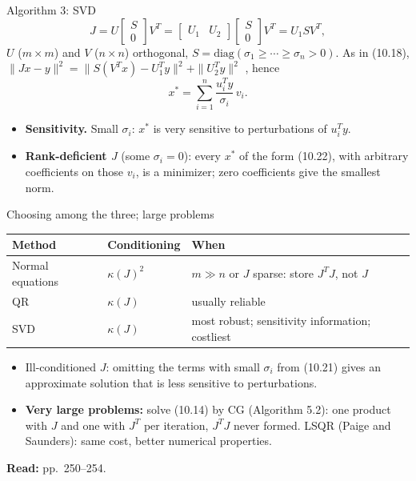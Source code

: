 \documentclass[aspectratio=169,12pt]{beamer}
\newcommand{\xs}{x^{*}}
\newcommand{\eqn}[1]{\text{\small(#1)}}
\newcommand{\readbook}[1]{{\color{red}\textbf{Read:} #1}}
\begin{document}
\begin{frame}{Algorithm 3: SVD}
  \[ J=U\begin{bmatrix}S\\0\end{bmatrix}V^{T}=\begin{bmatrix}U_{1}&U_{2}\end{bmatrix}\begin{bmatrix}S\\0\end{bmatrix}V^{T}=U_{1}SV^{T}, \tag{10.19} \]
  $U$ ($m\times m$) and $V$ ($n\times n$) orthogonal, $S=\mathrm{diag}(\sigma_{1}\ge\cdots\ge\sigma_{n}>0)$.
  As in (10.18), $\|Jx-y\|^{2}=\|S(V^{T}x)-U_{1}^{T}y\|^{2}+\|U_{2}^{T}y\|^{2}$ \eqn{10.20}, hence
  \[ \xs=\sum_{i=1}^{n}\frac{u_{i}^{T}y}{\sigma_{i}}\,v_{i} . \tag{10.21} \]
  \begin{itemize}\setlength\itemsep{0.3em}
    \item \textbf{Sensitivity.} Small $\sigma_{i}$: $\xs$ is very sensitive to perturbations of $u_{i}^{T}y$.
    \item \textbf{Rank-deficient $J$} (some $\sigma_{i}=0$): every $\xs$ of the form (10.22), with arbitrary
      coefficients on those $v_{i}$, is a minimizer; zero coefficients give the smallest norm.
  \end{itemize}
\end{frame}

\begin{frame}{Choosing among the three; large problems}
  \begin{center}
  \small\setlength\tabcolsep{6pt}
  \begin{tabular}{lll}
    \toprule
    Method & Conditioning & When \\
    \midrule
    Normal equations & $\kappa(J)^{2}$ & $m\gg n$ or $J$ sparse: store $J^{T}J$, not $J$ \\
    QR & $\kappa(J)$ & usually reliable \\
    SVD & $\kappa(J)$ & most robust; sensitivity information; costliest \\
    \bottomrule
  \end{tabular}
  \end{center}

  \vspace{0.1em}
  \begin{itemize}\setlength\itemsep{0.3em}
    \item Ill-conditioned $J$: omitting the terms with small $\sigma_{i}$ from (10.21) gives an
      approximate solution that is less sensitive to perturbations.
    \item \textbf{Very large problems:} solve (10.14) by CG (Algorithm 5.2): one product with $J$ and
      one with $J^{T}$ per iteration, $J^{T}J$ never formed. LSQR (Paige and Saunders): same cost,
      better numerical properties.
  \end{itemize}
  \readbook{pp.~250--254.}
\end{frame}
\end{document}
